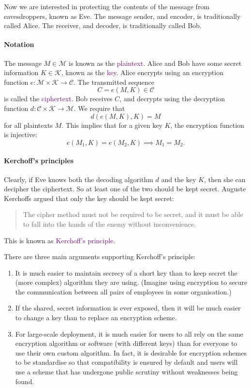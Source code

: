 \documentclass[a4paper, 11pt, openany]{book}
\numberwithin{equation}{section}
\theoremstyle{plain}
\theoremstyle{definition}
\newcommand{\Define}[1]{\textcolor{purple}{#1}}
\newcommand{\alphabet}[1]{\mathcal{#1}}
\begin{document}
Now we are interested in protecting the contents of the message from eavesdroppers, known as Eve. The message sender, and encoder, is traditionally called Alice.
The receiver, and decoder, is traditionally called Bob.





\paragraph{Notation}

The message $M \in \alphabet{M}$ is known as the \Define{plaintext}. Alice and Bob have some secret information $K \in \alphabet{K}$, known as the \Define{key}.
Alice encrypts using an encryption function $e : \alphabet{M} \times \alphabet{K} \to \alphabet{C}$.
The transmitted sequence
\[
    C = e(M,K) \in \alphabet{C}
\]
is called the \Define{ciphertext}. Bob receives $C$, and decrypts using the decryption function $d : \alphabet{C} \times \alphabet{K} \to \alphabet{M}$. We require that
\[
    d( e(M,K), K ) = M
\]
for all plaintexts $M$. This implies that for a given key $K$, the encryption function is injective:
\[
    e(M_1, K) = e(M_2, K) \implies M_1 = M_2.
\]




\paragraph{Kerchoff's principles}

Clearly, if Eve knows both the decoding algorithm $d$ and the key $K$, then she can decipher the ciphertext. So at least one of the two should be kept secret. Auguste Kerchoffs argued that only the key should be kept secret:
\begin{quote}
    The cipher method must not be required to be secret, and it must be able to fall into the hands of the enemy without inconvenience.
\end{quote}
This is known as \Define{Kerchoff's principle}.

There are three main arguments supporting Kerchoff's principle:
\begin{enumerate}
    \item It is much easier to maintain secrecy of a short key than to keep secret the (more complex) algorithm they are using. (Imagine using encryption to secure the communication between all pairs of employees in some organisation.)
    
    \item If the shared, secret information is ever exposed, then it will be much easier to change a key than to replace an encryption scheme.
    
    \item For large-scale deployment, it is much easier for users to all rely on the same encryption algorithm or software (with different keys) than for everyone to use their own custom algorithm. In fact, it is desirable for encryption schemes to be standardise so that compatibility is ensured by default and users will use a scheme that has undergone public scrutiny without weaknesses being found.
\end{enumerate}
\end{document}
